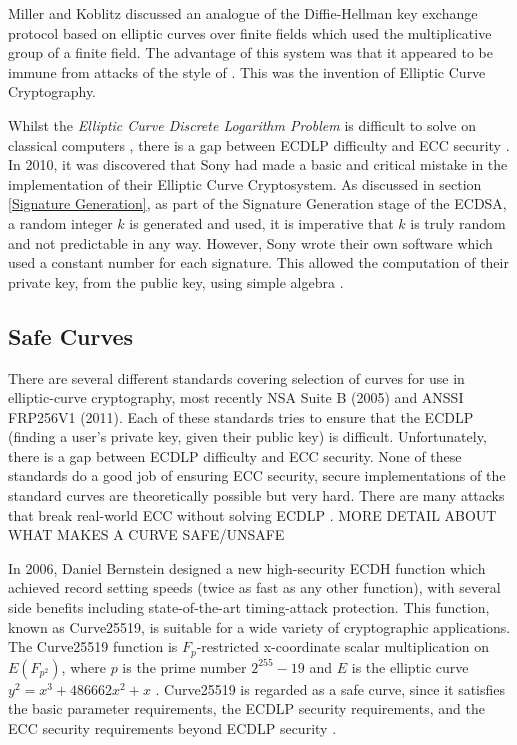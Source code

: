 \documentclass[12pt,a4paper]{article}
\begin{document}
Miller \citeyear{10.1007/3-540-39799-X_31} and Koblitz \citeyear{koblitz1987elliptic} discussed an analogue of the Diffie-Hellman key exchange protocol based on elliptic curves over finite fields which used the multiplicative group of a finite field. 
The advantage of this system was that it appeared to be immune from attacks of the style of \cite{10.1007/3-540-39799-X_31,4568001}. 
This was the invention of Elliptic Curve Cryptography. 

Whilst the \emph{Elliptic Curve Discrete Logarithm Problem} is difficult to solve on classical computers \cite{hankerson2003guide}, 
there is a gap between ECDLP difficulty and ECC security \cite{bernstein2013safecurves}. 
In 2010, it was discovered that Sony had made a basic and critical mistake in the implementation of their Elliptic Curve Cryptosystem. 
As discussed in section \ref{Signature Generation}, as part of the Signature Generation stage of the ECDSA, a random integer $k$ is generated and used, 
it is imperative that $k$ is truly random and not predictable in any way. 
However, Sony wrote their own software which used a constant number for each signature. 
This allowed the computation of their private key, from the public key, using simple algebra \cite{hotz2010console}.


\subsection{Safe Curves} \noindent \label{Safe Curves}
There are several different standards covering selection of curves for use in elliptic-curve cryptography, 
most recently NSA Suite B (2005) and ANSSI FRP256V1 (2011). 
Each of these standards tries to ensure that the ECDLP (finding a user's private key, given their public key) is difficult. 
Unfortunately, there is a gap between ECDLP difficulty and ECC security. 
None of these standards do a good job of ensuring ECC security, 
secure implementations of the standard curves are theoretically possible but very hard. 
There are many attacks that break real-world ECC without solving ECDLP \cite{bernstein2013safecurves}. 
MORE DETAIL ABOUT WHAT MAKES A CURVE SAFE/UNSAFE

In 2006, Daniel Bernstein designed a new high-security ECDH function which achieved record setting speeds (twice as fast as any other function), 
with several side benefits including state-of-the-art timing-attack protection. 
This function, known as Curve25519, is suitable for a wide variety of cryptographic applications. 
The Curve25519 function is $F_p$-restricted x-coordinate scalar multiplication on $E(F_{p^2})$, 
where $p$ is the prime number $2^{255} - 19$ and $E$ is the elliptic curve $y^2 = x^3 + 486662x^2 + x$ \cite{10.1007/11745853_14}.
Curve25519 is regarded as a safe curve, since it satisfies the basic parameter requirements, the ECDLP security requirements, 
and the ECC security requirements beyond ECDLP security \cite{bernstein2013safecurves}.
\end{document}
